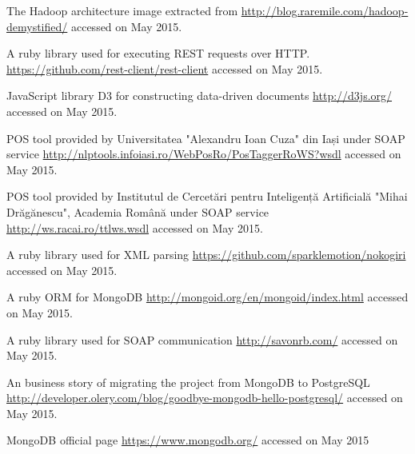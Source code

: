\begin{thebibliography}{99999}
\singlespace\normalsize


 The Hadoop architecture image extracted from \url{http://blog.raremile.com/hadoop-demystified/} accessed on May 2015.

 A ruby library used for executing REST requests over HTTP. \url{https://github.com/rest-client/rest-client} accessed on May 2015.

 JavaScript library D3 for constructing data-driven documents \url{http://d3js.org/} accessed on May 2015.

 POS tool provided by Universitatea "Alexandru Ioan Cuza" din Iași under SOAP service \url{http://nlptools.infoiasi.ro/WebPosRo/PosTaggerRoWS?wsdl} accessed on May 2015.

 POS tool provided by Institutul de Cercetări pentru Inteligență Artificială "Mihai Drăgănescu", Academia Română under SOAP service \url{http://ws.racai.ro/ttlws.wsdl} accessed on May 2015.

 A ruby library used for XML parsing \url{https://github.com/sparklemotion/nokogiri} accessed on May 2015.

 A ruby ORM for MongoDB \url{http://mongoid.org/en/mongoid/index.html} accessed on May 2015.

 A ruby library used for SOAP communication \url{http://savonrb.com/} accessed on May 2015.

 An business story of migrating the project from MongoDB to PostgreSQL \url{http://developer.olery.com/blog/goodbye-mongodb-hello-postgresql/} accessed on May 2015.

 MongoDB official page \url{https://www.mongodb.org/} accessed on May 2015

\end{thebibliography}
